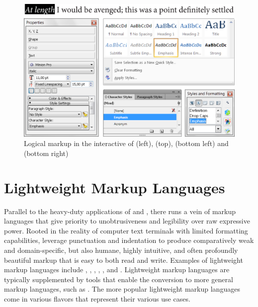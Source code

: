 \begin{figure}
  \includegraphics[width=\textwidth]{examples/02/interactive-editors.png}
  \caption{Logical markup in the interactive  of 
    (left),  (top),  (bottom left) and
     (bottom right)}
\end{figure}

\section{Lightweight Markup Languages}
Parallel to the heavy-duty applications of  and ,
there runs a vein of markup languages that give priority to unobtrusiveness and
legibility over raw expressive power. Rooted in the reality of computer text
terminals with limited formatting capabilities,  leverage punctuation and indentation to produce comparatively weak and
domain-specific, but also humane, highly intuitive, and often profoundly
beautiful markup that is easy to both read and write. Examples of lightweight
markup languages include , , ,
, , and .  Lightweight markup languages
are typically supplemented by tools that enable the conversion to more general
markup languages, such as . The more popular lightweight markup
languages come in various flavors that represent their various use cases.
